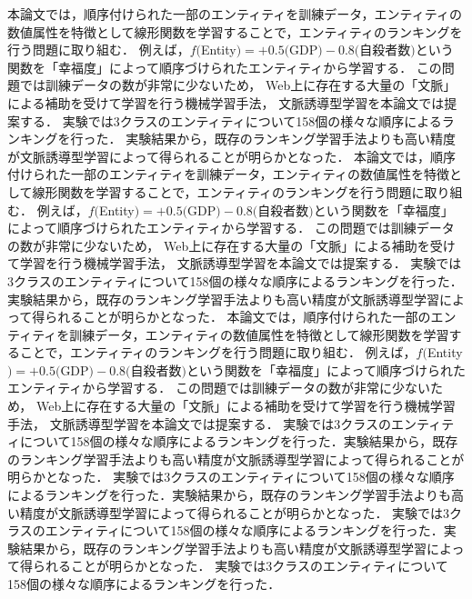 \begin{abst}
本論文では，順序付けられた一部のエンティティを訓練データ，エンティティの数値属性を特徴として線形関数を学習することで，エンティティのランキングを行う問題に取り組む．
例えば，$f($Entity$) = +0.5($GDP$) − 0.8($自殺者数$)$という関数を「幸福度」によって順序づけられたエンティティから学習する．
この問題では訓練データの数が非常に少ないため，
Web上に存在する大量の「文脈」による補助を受けて学習を行う機械学習手法，
文脈誘導型学習を本論文では提案する．
実験では3クラスのエンティティについて158個の様々な順序によるランキングを行った．
実験結果から，既存のランキング学習手法よりも高い精度が文脈誘導型学習によって得られることが明らかとなった．
本論文では，順序付けられた一部のエンティティを訓練データ，エンティティの数値属性を特徴として線形関数を学習することで，エンティティのランキングを行う問題に取り組む．
例えば，$f($Entity$) = +0.5($GDP$) − 0.8($自殺者数$)$という関数を「幸福度」によって順序づけられたエンティティから学習する．
この問題では訓練データの数が非常に少ないため，
Web上に存在する大量の「文脈」による補助を受けて学習を行う機械学習手法，
文脈誘導型学習を本論文では提案する．
実験では3クラスのエンティティについて158個の様々な順序によるランキングを行った．
実験結果から，既存のランキング学習手法よりも高い精度が文脈誘導型学習によって得られることが明らかとなった．
本論文では，順序付けられた一部のエンティティを訓練データ，エンティティの数値属性を特徴として線形関数を学習することで，エンティティのランキングを行う問題に取り組む．
例えば，$f($Entity$) = +0.5($GDP$) − 0.8($自殺者数$)$という関数を「幸福度」によって順序づけられたエンティティから学習する．
この問題では訓練データの数が非常に少ないため，
Web上に存在する大量の「文脈」による補助を受けて学習を行う機械学習手法，
文脈誘導型学習を本論文では提案する．
実験では3クラスのエンティティについて158個の様々な順序によるランキングを行った．実験結果から，既存のランキング学習手法よりも高い精度が文脈誘導型学習によって得られることが明らかとなった．
実験では3クラスのエンティティについて158個の様々な順序によるランキングを行った．実験結果から，既存のランキング学習手法よりも高い精度が文脈誘導型学習によって得られることが明らかとなった．
実験では3クラスのエンティティについて158個の様々な順序によるランキングを行った．実験結果から，既存のランキング学習手法よりも高い精度が文脈誘導型学習によって得られることが明らかとなった．
実験では3クラスのエンティティについて158個の様々な順序によるランキングを行った．

\end{abst}